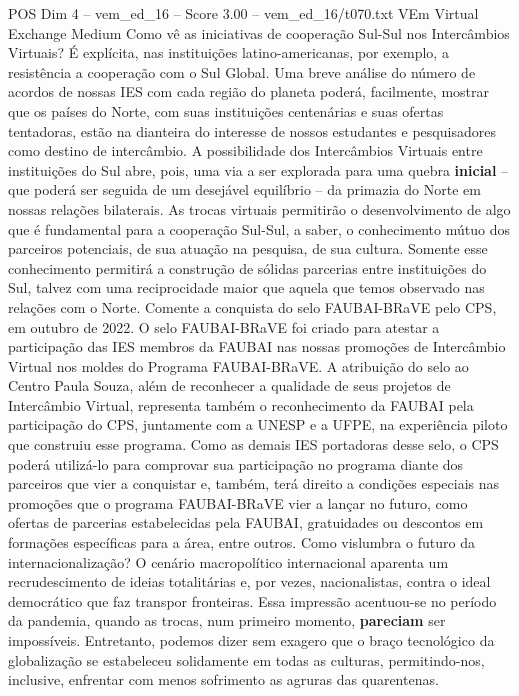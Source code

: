 \begin{textsample}{POS Dim 4 – vem\_ed\_16 – Score 3.00 – vem\_ed\_16/t070.txt}  \label{ex:f4_pos_069}
VEm Virtual Exchange Medium Como vê as iniciativas de cooperação Sul-Sul nos Intercâmbios Virtuais?
É explícita, nas instituições latino-americanas, por exemplo, a resistência a cooperação com o Sul Global.
Uma breve análise do número de acordos de nossas IES com cada região do planeta poderá, facilmente, mostrar que os países do Norte, com suas instituições centenárias e suas ofertas tentadoras, estão na dianteira do interesse de nossos estudantes e pesquisadores como destino de intercâmbio.
A possibilidade dos Intercâmbios Virtuais entre instituições do Sul abre, pois, uma via a ser explorada para uma quebra \textbf{inicial} – que poderá ser seguida de um desejável equilíbrio – da primazia do Norte em nossas relações bilaterais.
As trocas virtuais permitirão o desenvolvimento de algo que é fundamental para a cooperação Sul-Sul, a saber, o conhecimento mútuo dos parceiros potenciais, de sua atuação na pesquisa, de sua cultura.
Somente esse conhecimento permitirá a construção de sólidas parcerias entre instituições do Sul, talvez com uma reciprocidade maior que aquela que temos observado nas relações com o Norte.
Comente a conquista do selo FAUBAI-BRaVE pelo CPS, em outubro de 2022.
O selo FAUBAI-BRaVE foi criado para atestar a participação das IES membros da FAUBAI nas nossas promoções de Intercâmbio Virtual nos moldes do Programa FAUBAI-BRaVE.
A atribuição do selo ao Centro Paula Souza, além de reconhecer a qualidade de seus projetos de Intercâmbio Virtual, representa também o reconhecimento da FAUBAI pela participação do CPS, juntamente com a UNESP e a UFPE, na experiência piloto que construiu esse programa.
Como as demais IES portadoras desse selo, o CPS poderá utilizá-lo para comprovar sua participação no programa diante dos parceiros que vier a conquistar e, também, terá direito a condições especiais nas promoções que o programa FAUBAI-BRaVE vier a lançar no futuro, como ofertas de parcerias estabelecidas pela FAUBAI, gratuidades ou descontos em formações específicas para a área, entre outros.
Como vislumbra o futuro da internacionalização?
O cenário macropolítico internacional aparenta um recrudescimento de ideias totalitárias e, por vezes, nacionalistas, contra o ideal democrático que faz transpor fronteiras.
Essa impressão acentuou-se no período da pandemia, quando as trocas, num primeiro momento, \textbf{pareciam} ser impossíveis.
Entretanto, podemos dizer sem exagero que o braço tecnológico da globalização se estabeleceu solidamente em todas as culturas, permitindo-nos, inclusive, enfrentar com menos sofrimento as agruras das quarentenas.

\end{textsample}
